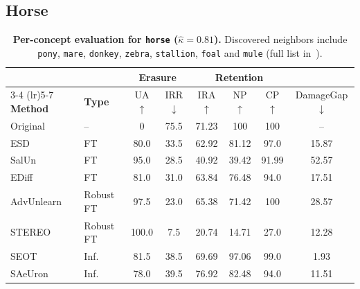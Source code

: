 \subsection{Horse}
\label{app:per_concept_horse}

\begin{table}[ht]
\centering
\small
\setlength{\tabcolsep}{5pt}
\begin{tabular}{llcccccc}
\toprule
& & \multicolumn{2}{c}{\textbf{Erasure}} & \multicolumn{3}{c}{\textbf{Retention}} & \\
\cmidrule(lr){3-4} \cmidrule(lr){5-7}
\textbf{Method} & \textbf{Type} & UA$\uparrow$ & IRR$\downarrow$ & IRA$\uparrow$ & NP$\uparrow$ & CP$\uparrow$ & DamageGap$\downarrow$ \\
\midrule
Original    & --          & 0     & 75.5  & 71.23 & 100   & 100   & --    \\
\midrule
ESD         & FT          & 80.0  & 33.5  & 62.92 & 81.12 & 97.0  & 15.87 \\
SalUn       & FT          & 95.0  & 28.5  & 40.92 & 39.42 & 91.99 & 52.57 \\
EDiff       & FT          & 81.0  & 31.0  & 63.84 & 76.48 & 94.0  & 17.51 \\
\midrule
AdvUnlearn  & Robust FT   & 97.5  & 23.0  & 65.38 & 71.42 & 100   & 28.57 \\
STEREO      & Robust FT   & 100.0 & 7.5   & 20.74 & 14.71 & 27.0  & 12.28 \\
\midrule
SEOT        & Inf.        & 81.5  & 38.5  & 69.69 & 97.06 & 99.0  & 1.93  \\
SAeUron     & Inf.        & 78.0  & 39.5  & 76.92 & 82.48 & 94.0  & 11.51 \\
\bottomrule
\end{tabular}
\caption{\textbf{Per-concept evaluation for \texttt{horse} ($\hat\kappa = 0.81$).} Discovered neighbors include 
\texttt{pony}, \texttt{mare}, \texttt{donkey}, \texttt{zebra}, \texttt{stallion}, \texttt{foal} and \texttt{mule} (full list in~).}
\label{tab:per_concept_horse}
\end{table}

